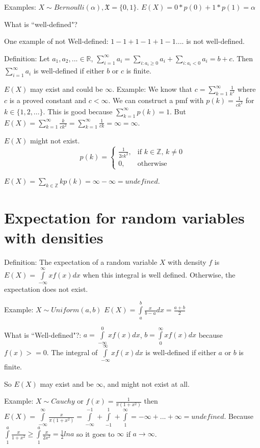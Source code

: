 \documentclass[12pt]{article}
\begin{document}
Examples:
$X\sim Bernoulli(\alpha),\mathfrak{X}=\{0,1\}$.
$E(X)=0*p(0)+1*p(1)=\alpha$
\bigbreak

What is ``well-defined"?

One example of not Well-defined: $1-1+1-1+1-1....$ is not well-defined.
\bigbreak

Definition: Let $a_1,a_2,...\in\mathbb{R}$, $\sum\limits_{i=1}^{\infty}a_i=\sum\limits_{i:a_i\ge 0}a_i
+\sum\limits_{i:a_i<0}a_i=b+c$. Then $\sum\limits_{i=1}^{\infty}a_i$ is well-defined if 
either $b$ or $c$ is finite.
\bigbreak

$E(X)$ may exist and could be $\infty$. Example:
We know that $c=\sum\limits_{k=1}^{\infty}\frac{1}{k^2}$ where $c$ is a proved constant and
$c<\infty$. We can construct a pmf with $p(k)=\frac{1}{ck^2}$ for $k\in\{1,2,...\}$.
This is good because $\sum\limits_{k=1}^{\infty}p(k)=1$.
But $E(X)=\sum\limits_{k=1}^{\infty}\frac{k}{ck^2}=\sum\limits_{k=1}^{\infty}\frac{1}{ck}=\infty=\infty$.
\bigbreak

$E(X)$ might not exist.
\begin{equation}
    p(k)=\begin{cases}
        \frac{1}{2ck^2}, & \text{if $k\in \mathds{Z}$, $k \neq 0$} \\
        0, & \text{otherwise}
    \end{cases}
\end{equation}

$E(X)=\sum\limits_{k\in\mathds{Z}}kp(k)=\infty-\infty=undefined$.

\section{Expectation for random variables with densities}

Definition: The expectation of a random variable $X$ with density $f$
is $E(X)=\int\limits_{-\infty}^{\infty}xf(x)dx$ when this integral is well defined.
Otherwise, the expectation does not exist.

Example: $X\sim Uniform(a,b)$ $E(X)=\int\limits_{a}^{b}\frac{x}{b-a}dx=\frac{a+b}{2}$
\bigbreak

What is ``Well-defined"?: $a=\int\limits_{-\infty}^{0}xf(x)dx$, $b=\int\limits_{0}^{\infty}xf(x)dx$
because $f(x)>=0$. The integral of $\int\limits_{-\infty}^{\infty}xf(x)dx$ is well-defined if either
$a$ or $b$ is finite.
\bigbreak

So $E(X)$ may exist and be $\infty$, and might not exist at all.

Example: $X\sim Cauchy$ or $f(x)=\frac{1}{\pi(1+x^2)}$ then
$E(X)=\int\limits_{-\infty}^{\infty}\frac{x}{\pi (1+x^2)}=\int\limits_{-\infty}^{-1} +
\int\limits_{-1}^{1}+\int\limits_{1}^{\infty}=-\infty + ... + \infty = undefined$.
Because $\int\limits_{1}^{a}\frac{x}{1+x^2}\ge\int\limits_{1}^{a}\frac{x}{2x^2}=\frac{1}{2}lna$
so it goes to $\infty$ if $a\rightarrow\infty$.
\end{document}
